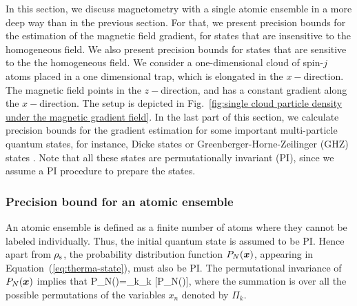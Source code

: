 In this section, we discuss magnetometry with a single
atomic ensemble in a more deep way than in the previous section.
For that, we present precision bounds for
the estimation of the magnetic field gradient, for
states that are insensitive to the homogeneous field.
We also present precision bounds for states that are sensitive to the
the homogeneous field.
We consider a one-dimensional cloud of spin-$j$ atoms
placed in a one dimensional trap, which is elongated
in the  $x-$direction.
The magnetic field points in the  $z-$direction,
and has a constant gradient along the $x-$direction.
The setup is depicted
in Fig.~\ref{fig:single cloud particle density under the magnetic gradient field}.
In the last part of this section, we calculate precision bounds for the
gradient estimation for some important multi-particle quantum states,
for instance, Dicke states or
Greenberger-Horne-Zeilinger (GHZ) states \citep{Greenberger1990}.
Note that all these states are permutationally invariant (PI), since we
assume a PI procedure to prepare the states.

\subsubsection{Precision bound for an atomic ensemble}

An atomic ensemble is defined as a finite number of atoms where
they cannot be labeled individually.
Thus, the initial quantum state is assumed to be PI.
Hence apart from $\rho_{\rm s}$, the probability distribution function
$P_N(\boldsymbol{x})$, appearing in Equation~(\ref{eq:therma-state}),
must also be PI.
The permutational invariance of $P_N(\boldsymbol{x})$ implies that
\be
\label{eq:pi-for-pdf}
P_N()=\sum_{k}\Pi_k [P_N()],
\ee
where the summation is over all the possible permutations
of the variables $x_n$ denoted by
$\Pi_k.$

